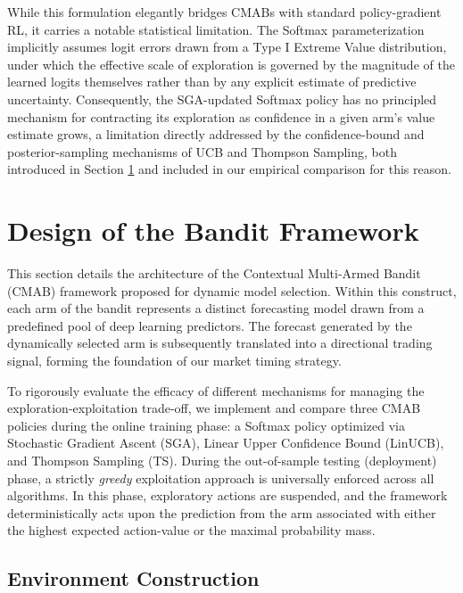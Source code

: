 \documentclass[pdflatex,sn-mathphys-num]{sn-jnl}
\theoremstyle{thmstyleone}%
\theoremstyle{thmstyletwo}%
\theoremstyle{thmstylethree}%
\begin{document}
While this formulation elegantly bridges CMABs with standard policy-gradient RL, it carries a notable statistical limitation. The Softmax parameterization implicitly assumes logit errors drawn from a Type I Extreme Value distribution, under which the effective scale of exploration is governed by the magnitude of the learned logits themselves rather than by any explicit estimate of predictive uncertainty. Consequently, the SGA-updated Softmax policy has no principled mechanism for contracting its exploration as confidence in a given arm's value estimate grows, a limitation directly addressed by the confidence-bound and posterior-sampling mechanisms of UCB and Thompson Sampling, both introduced in Section \ref{sec:methods} and included in our empirical comparison for this reason.

\section{Design of the Bandit Framework}
\label{sec:methods}

This section details the architecture of the Contextual Multi-Armed Bandit (CMAB) framework proposed for dynamic model selection. Within this construct, each arm of the bandit represents a distinct forecasting model drawn from a predefined pool of deep learning predictors. The forecast generated by the dynamically selected arm is subsequently translated into a directional trading signal, forming the foundation of our market timing strategy.

To rigorously evaluate the efficacy of different mechanisms for managing the exploration-exploitation trade-off, we implement and compare three CMAB policies during the online training phase: a Softmax policy optimized via Stochastic Gradient Ascent (SGA), Linear Upper Confidence Bound (LinUCB), and Thompson Sampling (TS). During the out-of-sample testing (deployment) phase, a strictly \emph{greedy} exploitation approach is universally enforced across all algorithms. In this phase, exploratory actions are suspended, and the framework deterministically acts upon the prediction from the arm associated with either the highest expected action-value or the maximal probability mass.

\subsection{Environment Construction}
\label{sec:dataset}
\end{document}
